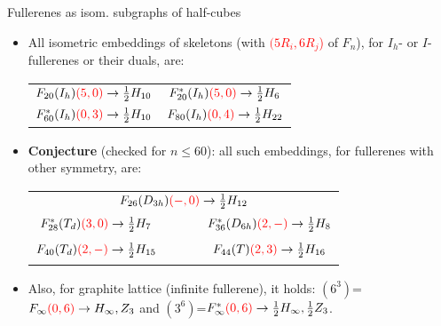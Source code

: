 \documentclass[%
pdf,
colorBG,
slideColor,
]{prosper}
\begin{document}
\begin{slide}{Fullerenes as isom. subgraphs of half-cubes}
\begin{itemize}
\item All isometric embeddings of skeletons 
(with \textcolor{red}{$(5R_i,6R_j$)}
of $F_n$), for $I_h$- 
or $I$-fullerenes or their duals, are:
\begin{center}
\begin{tabular}{cc}
$F_{20}(I_h)\textcolor{red}{(5,0)}  \to \frac{1}{2}H_{10}$ & 
$F_{20}^{*}(I_h)\textcolor{red}{(5,0)}  \to \frac{1}{2}H_{6}$\\
$F_{60}^{*}(I_h)\textcolor{red}{(0,3)}  \to \frac{1}{2}H_{10}$ & 
$F_{80}(I_h)\textcolor{red}{(0,4)}  \to \frac{1}{2}H_{22}$
\end{tabular}
\end{center}
\item {\bf Conjecture} (checked for $n \le 60$): all
such embeddings, for fullerenes with other symmetry, are:
\begin{center}
\begin{tabular}{ccc}
\multicolumn{3}{c}{$F_{26}(D_{3h})\textcolor{red}{(-,0)}  \to 
\frac{1}{2}H_{12}$}\\
$F_{28}^{*}(T_d)\textcolor{red}{(3,0)}  \to \frac{1}{2}H_{7}$& 
\mbox{~~~}&$F_{36}^{*}(D_{6h})\textcolor{red}{(2,-)}  \to 
\frac{1}{2}H_{8}$\\
$F_{40}(T_d)\textcolor{red}{(2,-)}  \to \frac{1}{2}H_{15}$& 
\mbox{~~~}&$F_{44}(T)\textcolor{red}{(2,3)}  \to \frac{1}{2}H_{16}$
\end{tabular}
\end{center}
\item Also, for graphite lattice (infinite fullerene), it holds:
$(6^3)$=$F_{\infty}\textcolor{red}{(0,6)} \to H_{\infty},Z_{3}$ and 
$(3^6)$=$F_{\infty}^{*}\textcolor{red}{(0,6)} \to \frac{1}{2}H_{\infty},
\frac{1}{2}Z_{3}$.
\end{itemize}
\end{slide}
\end{document}
